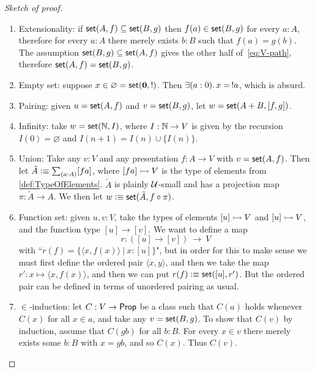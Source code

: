 \begin{proof}[Sketch of proof]
  \mbox{}
  \begin{enumerate}
  \item Extensionality: if $\mathsf{set}(A,f) \subseteq \mathsf{set}(B, g)$ then $f(a) \in \mathsf{set}(B, g)$
    for every $a : A$, therefore for every $a : A$ there merely exists $b : B$ such that
    $f(a) = g(b)$. The assumption $\mathsf{set}(B, g) \subseteq \mathsf{set}(A, f)$ gives the other half
    of~\eqref{eq:V-path}, therefore $\mathsf{set}(A,f) = \mathsf{set}(B,g)$.
    
  \item Empty set: suppose $x\in \varnothing = \mathsf{set}(\mathbf{0},!)$.  Then $\exis{a:0}x=\, !a$, which is absurd.
  
  \item Pairing: given $u = \mathsf{set}(A,f)$ and $v=\mathsf{set}(B,g)$, let $w=\mathsf{set}(A+B,[f,g])$.

  \item Infinity: take $w = \mathsf{set}(\mathbb{N},I)$, where $I: \mathbb{N} \to V$ is given by the recursion $I(0) = \varnothing$ and $I(n+1) = I(n)\cup \{I(n)\}$.
 
  \item Union: Take any $v:V$ and any presentation $f :A\to V$ with $v=\mathsf{set}(A,f)$.  Then let $\tilde{A} \defeq \sm{a:A}[fa]$, where $[fa] \rightarrowtail V$ is the type of elements from \autoref{def:TypeOfElements}.  $\tilde{A}$ is plainly $\mathcal{U}$-small and has a projection map $\pi:\tilde{A}\to A$.  We then let $w \vcentcolon\equiv \mathsf{set}(\tilde{A}, f\circ\pi)$.
  
  \item Function set: given $u, v:V$, take the types of elements $[u] \rightarrowtail V$ and $[u] \rightarrowtail V$, and the function type $[u]\to [v]$.  We want to define a map
  \[
 r: ([u]\to [v])\ \longrightarrow\ V
  \] 
   with ``$r(f) = \{ \langle x, f(x)\rangle\ |\ x:[u] \}$", but in order for this to make sense we must first define the ordered pair $\langle x, y\rangle$, and then we take the map $r': x \mapsto \langle x, f(x)\rangle$, and then we can put $r(f)\vcentcolon\equiv \mathsf{set}([u], r')$.  But the ordered pair can be defined in terms of unordered pairing as usual.
   
  \item $\in$-induction: let $C : V \to \mathsf{Prop}$ be a class such that $C(a)$ holds whenever $C(x)$ for all $x\in a$, and take any $v=\mathsf{set}(B,g)$.  To show that $C(v)$ by induction, assume that $C(gb)$ for all $b:B$.  For every $x\in v$ there merely exists some $b:B$ with $x = gb$, and so $C(x)$.  Thus $C(v)$.


\end{enumerate}
\end{proof}
